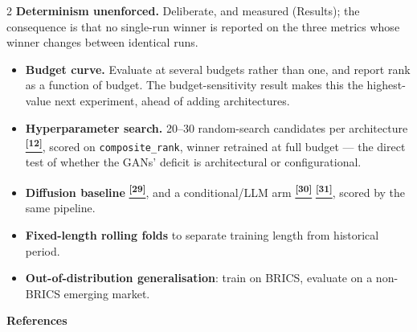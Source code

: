 \documentclass[10pt]{article}
\newcommand{\amberbox}[2]{\begin{tcolorbox}[mybox={Amber}{ABg},title={#1}]#2\end{tcolorbox}}
\newcommand{\tcite}[1]{%
  \hyperlink{R:#1}{\textsuperscript{\scriptsize\textbf{[#1]}}}}
\begin{document}
\begin{multicols}{2}
{\textbf{Determinism unenforced.} Deliberate, and measured (Results); the consequence is that no single-run winner is reported on the three metrics whose winner changes between identical runs.}

\amberbox{Future Work}{%
\begin{itemize}
  \item \textbf{Budget curve.} Evaluate at several budgets rather than one, and report rank as a function of budget. The budget-sensitivity result makes this the highest-value next experiment, ahead of adding architectures.
  \item \textbf{Hyperparameter search.} 20--30 random-search candidates per architecture\tcite{12}, scored on \texttt{composite\_rank}, winner retrained at full budget --- the direct test of whether the GANs' deficit is architectural or configurational.
  \item \textbf{Diffusion baseline}\tcite{29}, and a conditional/LLM arm\tcite{30}\tcite{31}, scored by the same pipeline.
  \item \textbf{Fixed-length rolling folds} to separate training length from historical period.
  \item \textbf{Out-of-distribution generalisation}: train on BRICS, evaluate on a non-BRICS emerging market.
\end{itemize}}

\end{multicols}

\clearpage

\begin{tcolorbox}[
  colback=NavyBg, colframe=NavyBg!60!black, arc=4pt,
  left=8pt, right=8pt, top=4pt, bottom=4pt,
  before skip=0pt, after skip=10pt]
{\large\bfseries\color{Navy} References}
\end{tcolorbox}
\end{document}
